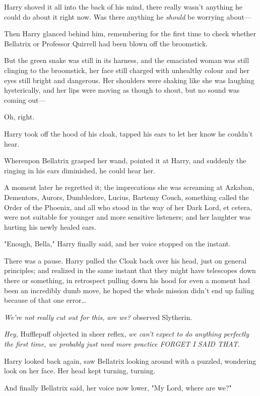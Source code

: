 Harry shoved it all into the back of his mind, there really wasn’t anything he
could do about it right now. Was there anything he \emph{should} be worrying
about—

Then Harry glanced behind him, remembering for the first time to check whether
Bellatrix or Professor Quirrell had been blown off the broomstick.

But the green snake was still in its harness, and the emaciated woman was still
clinging to the broomstick, her face still charged with unhealthy colour and her
eyes still bright and dangerous. Her shoulders were shaking like she was
laughing hysterically, and her lips were moving as though to shout, but no
sound was coming out—

Oh, right.

Harry took off the hood of his cloak, tapped his ears to let her know he
couldn’t hear.

Whereupon Bellatrix grasped her wand, pointed it at Harry, and suddenly the
ringing in his ears diminished, he could hear her.

A moment later he regretted it; the imprecations she was screaming at Azkaban,
Dementors, Aurors, Dumbledore, Lucius, Bartemy Couch, something called the
Order of the Phoenix, and all who stood in the way of her Dark Lord, et cetera,
were not suitable for younger and more sensitive listeners; and her laughter
was hurting his newly healed ears.

"Enough, Bella," Harry finally said, and her voice stopped on the instant.

There was a pause. Harry pulled the Cloak back over his head, just on general
principles; and realized in the same instant that they might have telescopes
down there or something, in retrospect pulling down his hood for even a moment
had been an incredibly dumb move, he hoped the whole mission didn’t end up
failing because of that one error…

\emph{We’re not really cut out for this, are we?} observed Slytherin.

\emph{Hey,} Hufflepuff objected in sheer reflex, \emph{we can’t expect to do
anything perfectly the first time, we probably just need more practice FORGET I
SAID THAT.}

Harry looked back again, saw Bellatrix looking around with a puzzled, wondering
look on her face. Her head kept turning, turning.

And finally Bellatrix said, her voice now lower, "My Lord, where are we?"

